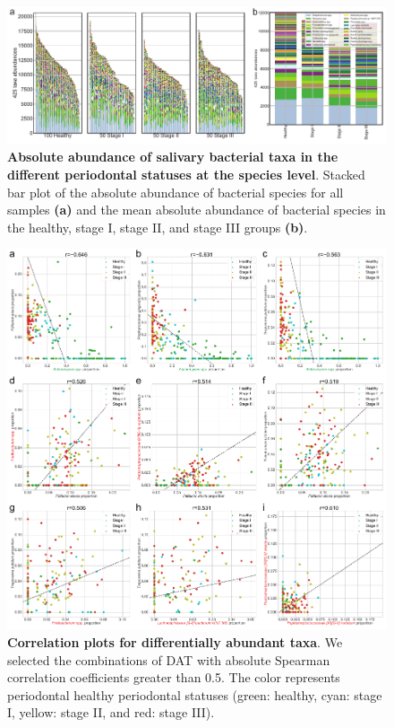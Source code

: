 \documentclass[11pt, a4paper, onecolumn, oneside]{report}
\begin{document}
            \begin{figure}[p]
                \centering
                \includegraphics[width=15 cm]{Figures/Periodontitis/Figure_S2.pdf}
                \caption[Absolute abundance of salivary bacterial taxa in the different periodontal statuses at the species level]{\textbf{Absolute abundance of salivary bacterial taxa in the different periodontal statuses at the species level}. Stacked bar plot of the absolute abundance of bacterial species for all samples \textbf{(a)} and the mean absolute abundance of bacterial species in the healthy, stage I, stage II, and stage III groups \textbf{(b)}.}
                \label{fig:Periodontitis-abundance}
            \end{figure}
            \clearpage

            \begin{figure}[p]
                \centering
                \includegraphics[width=12 cm]{Figures/Periodontitis/Figure_S3.pdf}
                \caption[Correlation plots for differentially abundant taxa]{\textbf{Correlation plots for differentially abundant taxa}. We selected the combinations of DAT with absolute Spearman correlation coefficients greater than 0.5. The color represents periodontal healthy periodontal statuses (green: healthy, cyan: stage I, yellow: stage II, and red: stage III).}
                \label{fig:Periodontitis-correlation2}
            \end{figure}
            \clearpage
\end{document}
